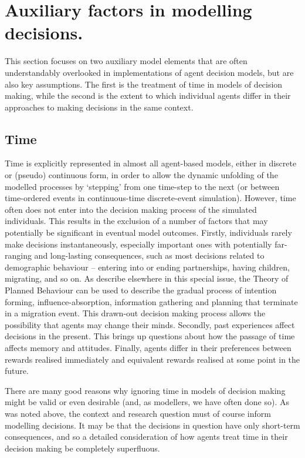 \documentclass{article}
\begin{document}
\section{Auxiliary factors in modelling
decisions.}\label{auxiliary-factors-in-modelling-decisions}

This section focuses on two auxiliary model elements that are often understandably overlooked in implementations of agent decision models, but are also key assumptions. The first is the treatment of time in models of decision making, while the second is the extent to which individual agents differ in their approaches to making decisions in the same context.

\subsection{Time}\label{time}

Time is explicitly represented in almost all agent-based models, either in discrete or (pseudo) continuous form, in order to allow the dynamic unfolding of the modelled processes by `stepping' from one time-step to the next (or between time-ordered events in continuous-time discrete-event simulation). However, time often  does not enter into the decision making process of the simulated individuals. This results in the exclusion of a number of factors that may potentially be significant in eventual model outcomes. Firstly, individuals rarely make decisions instantaneously, especially important ones with potentially far-ranging and long-lasting consequences, such as most decisions related to demographic behaviour -- entering into or ending partnerships, having children, migrating, and so on. As \cite{Willekens2017} describe elsewhere in this special issue, the Theory of Planned Behaviour \citep{Ajzen1991} can be used to describe the gradual process of intention forming, influence-absorption, information gathering and planning that terminate in a migration event. This drawn-out decision making process allows the possibility that agents may change their minds. Secondly, past experiences affect decisions in the present. This brings up questions about how the passage of time affects memory and attitudes. Finally, agents differ in their preferences between rewards realised immediately and equivalent rewards realised at some point in the future.

There are many good reasons why ignoring time in models of decision making might be valid or even desirable (and, as modellers, we have often done so). As was noted above, the context and research question must of course inform modelling decisions. It may be that the decisions in question have only short-term consequences, and so a detailed consideration of how agents treat time in their decision making be completely superfluous.
\end{document}
